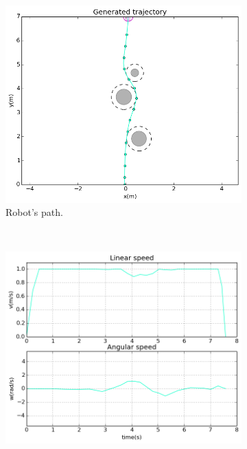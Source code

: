 \begin{figure}[!h]
        \centering
        ~ %
        \begin{subfigure}[b]{0.48\textwidth}
                \includegraphics[width=\textwidth]{./img/realtime/sim_results/p_3_0.48_2.4_11_4_0.001_15_40_20_5.0_0.1_3.0_0.5_1.0_10.0/multirobot-path.png}
                \caption{Robot's path.}\label{fig:rpath}
        \end{subfigure}
        ~ %
        \begin{subfigure}[b]{0.48\textwidth}
		\includegraphics[width=\textwidth]{./img/realtime/sim_results/p_3_0.48_2.4_11_4_0.001_15_40_20_5.0_0.1_3.0_0.5_1.0_10.0/multirobot-vw.png}

\end{subfigure}
\end{figure}
